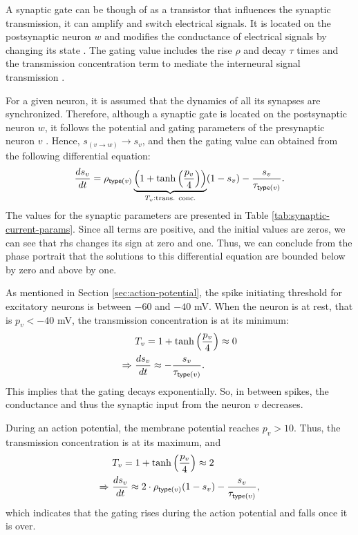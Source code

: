 A synaptic gate can be though of as a transistor that influences the synaptic transmission, it can amplify and switch electrical signals. It is located on the postsynaptic neuron $w$ and modifies the conductance of electrical signals by changing its state . The gating value includes the rise $\rho$ and decay $\tau$ times and the transmission concentration term to mediate the interneural signal transmission \cite{Destexhe1994}.

For a given neuron, it is assumed that the dynamics of all its synapses are synchronized. Therefore, although a synaptic gate is located on the postsynaptic neuron $w$, it follows the potential and gating parameters of the presynaptic neuron $v$ \cite{Lowet2015}. Hence, $s_{(v \to w)} \to s_v$, and then the gating value can obtained from the following differential equation:
\begin{equation}
    \frac{ds_v}{dt} = \rho_{\mathsf{type}(v)} \underbrace{\left( 1 + \tanh \left( \frac{p_{v}}{4} \right) \right)}_{T_v: \text{trans. conc.}} (1 - s_v) - \frac{s_v}{\tau_{\mathsf{type}(v)}}.
    \label{eq:synaptic-gates}
\end{equation}
The values for the synaptic parameters are presented in Table \ref{tab:synaptic-current-params}.
Since all terms are positive, and the initial values are zeros, we can see that rhs changes its sign at zero and one.
Thus, we can conclude from the phase portrait that the solutions to this differential equation are bounded below by zero and above by one.

As mentioned in Section \ref{sec:action-potential}, the spike initiating threshold for excitatory neurons is between $-60$ and $-40$ mV. When the neuron is at rest, that is $p_v < -40$ mV, the transmission concentration is at its minimum:
\begin{gather}
\begin{split}
    & T_v = 1 + \tanh \left( \frac{p_{v}}{4} \right) \approx 0 \\
    \Rightarrow \ & \frac{ds_v}{dt} \approx - \frac{s_v}{\tau_{\mathsf{type}(v)}}.
\end{split}
\end{gather}
This implies that the gating decays exponentially.
So, in between spikes, the conductance and thus the synaptic input from the neuron $v$ decreases. 

During an action potential, the membrane potential reaches $p_v > 10$. Thus, the transmission concentration is at its maximum, and
\begin{gather}
\begin{split}
    & T_v = 1 + \tanh \left( \frac{p_{v}}{4} \right) \approx 2 \\
    \Rightarrow \ & \frac{ds_v}{dt} \approx 2 \cdot \rho_{\mathsf{type}(v)} (1 - s_v) - \frac{s_v}{\tau_{\mathsf{type}(v)}},
\end{split}
\end{gather}
which indicates that the gating rises during the action potential and falls once it is over. 

